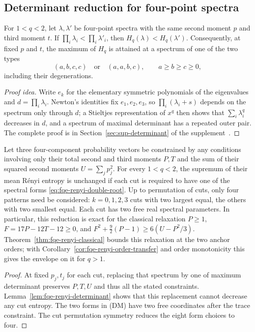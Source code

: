 \subsection{Determinant reduction for four-point spectra}
\label{sec:fqe-renyi-determinant}

\begin{lemma}
\label{lem:fqe-renyi-determinant}
For $1<q<2$, let $\lambda,\lambda'$ be four-point spectra with the same second moment $p$ and third moment $t$.
If $\prod_i\lambda_i<\prod_i\lambda'_i$, then $H_q(\lambda)<H_q(\lambda')$.
Consequently, at fixed $p$ and $t$, the maximum of $H_q$ is attained at a spectrum of one of the two types
\[
(a,b,c,c)\quad\text{or}\quad(a,a,b,c),
\qquad a\ge b\ge c\ge0,
\tag{DM}\label{eq:fqe-renyi-double-root}
\]
including their degenerations.
\end{lemma}
\begin{proof}[Proof idea]
Write $e_k$ for the elementary symmetric polynomials of the eigenvalues and $d=\prod_i\lambda_i$. Newton's identities fix $e_1,e_2,e_3$, so $\prod_i(\lambda_i+s)$ depends on the spectrum only through $d$; a
Stieltjes representation of $x^q$ then shows that $\sum_i\lambda_i^q$ decreases in $d$, and a spectrum of maximal
determinant has a repeated outer pair. The complete proof is in Section~\ref{sec:sup-determinant} of the supplement~\cite{Companion}.
\end{proof}


\begin{corollary}
\label{cor:fqe-renyi-six-variable}
Let three four-component probability vectors be constrained by any
conditions involving only their total second and third moments $P,T$
and the sum of their squared second moments
$U=\sum_jp_j^2$. For every $1<q<2$, the supremum of their mean
R\'enyi entropy is unchanged if each cut is required to have one
of the spectral forms \eqref{eq:fqe-renyi-double-root}.
Up to permutation of cuts, only four patterns need be considered:
$k=0,1,2,3$ cuts with two largest equal, the others with two
smallest equal. Each cut has two free real spectral parameters.
In particular, this reduction is exact for the classical relaxation
$P\ge1$, $F=17P-12T-12\ge0$, and
$F^2+\tfrac92(P-1)\ge6(U-P^2/3)$.
Theorem~\ref{thm:fqe-renyi-classical} bounds this relaxation at the two anchor orders; with
Corollary~\ref{cor:fqe-renyi-order-transfer} and order monotonicity this gives the envelope on it for $q>1$.
\end{corollary}
\begin{proof}
At fixed $p_j,t_j$ for each cut, replacing that spectrum by one of
maximum determinant preserves $P,T,U$ and thus all the stated
constraints. Lemma~\ref{lem:fqe-renyi-determinant} shows that this
replacement cannot decrease any cut entropy. The two forms in (DM)
have two free coordinates after the trace constraint. The cut
permutation symmetry reduces the eight form choices to four.
\end{proof}
